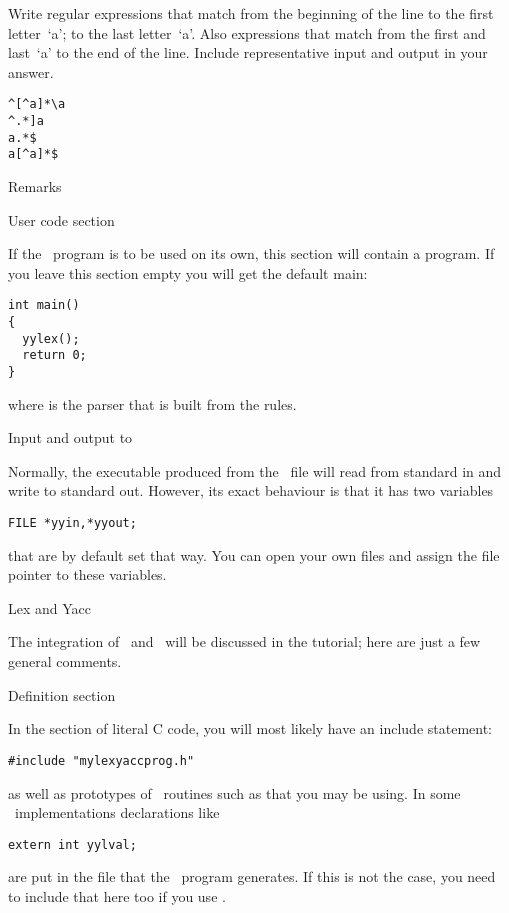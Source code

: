 \begin{594exercise}
Write regular expressions that match from the beginning of the line to
the first letter~`a'; to the last letter~`a'. Also expressions that
match from the first and last~`a' to the end of the line.
Include representative input and output in your answer.
\end{594exercise}
\begin{answer}
\begin{verbatim}
^[^a]*\a
^.*]a
a.*$
a[^a]*$
\end{verbatim}
\end{answer}

 {Remarks}

 {User code section}

If the \lex\ program is to be used on its own, this section will
contain a  program. If you leave this section empty you will
get the default main:
\begin{verbatim}
int main()
{
  yylex();
  return 0;
}
\end{verbatim}
where  is the parser that is built from the rules.

 {Input and output to \lex}

Normally, the executable produced from the \lex\ file will read from
standard in and write to standard out. However, its exact behaviour is
that it has two variables
\begin{verbatim}
FILE *yyin,*yyout;
\end{verbatim}
that are by default set that way. You can open your own files and
assign the file pointer to these variables.

 {Lex and Yacc}

The integration of \lex\ and \yacc\ will be discussed in the \yacc
tutorial; here are just a few general comments.

 {Definition section}

In the section of literal C code, you will most likely have an include
statement:
\begin{verbatim}
#include "mylexyaccprog.h"
\end{verbatim}
as well as prototypes of \yacc\ routines such as  that you
may be using. In some \yacc\ implementations declarations like 
\begin{verbatim}
extern int yylval;
\end{verbatim}
are put in the  file that the \yacc\ program generates. If this
is not the case, you need to include that here too if you use .

